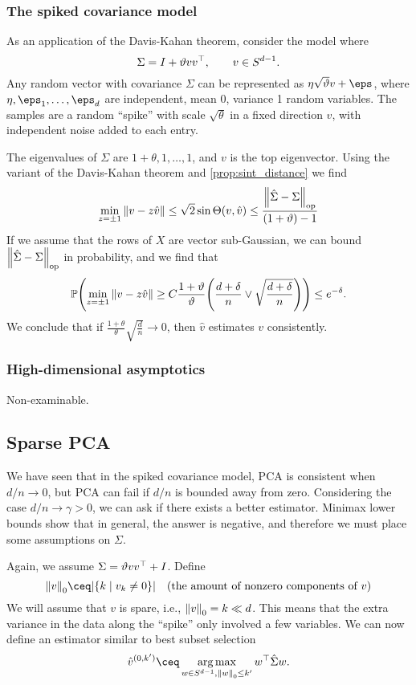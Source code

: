 \subsubsection{The spiked covariance model}
As an application of the Davis-Kahan theorem, consider the model where
\[
\Sigma = I + \vartheta v v^\top, \qquad  v\in S^{d-1}. 
\]
Any random vector with covariance $\Sigma$ can be represented as $\eta \sqrt\theta v + \eps$, where $\eta, \eps_1, \dotsc, \eps_d$ are independent, mean 0, variance 1 random variables. The samples are a random ``spike'' with scale $\sqrt\theta$ in a fixed direction $v$, with independent noise added to each entry. 

The eigenvalues of $\Sigma$ are $1+\theta, 1, \dotsc, 1$, and $v$ is the top eigenvector. Using the variant of the Davis-Kahan theorem and \cref{prop:sint_distance} we find 
\[
\min_{z = \pm 1} \norm{v - z\hat v} \leq \sqrt2 \sin\Theta(v, \hat v) \leq \frac{\norm{\hat \Sigma - \Sigma}_\mathrm{op}}{(1 + \vartheta) - 1}
\]
If we assume that the rows of $X$ are vector sub-Gaussian, we can bound $\norm{\hat\Sigma - \Sigma}_\mathrm{op}$ in probability, and we find that 
\[
\mathbb P\qty(\min_{z = \pm 1} \norm{v - z\hat v} \geq C \frac{1 + \vartheta}{\vartheta} \qty(\frac{d + \delta}{n} \lor \sqrt{\frac{d + \delta}{n}})) \leq e^{-\delta}. 
\]
We conclude that if $\frac{1+\theta}{\theta} \sqrt{\frac dn} \to 0$, then $\hat v$ estimates $v$ consistently. 

\subsubsection{High-dimensional asymptotics}
{\color{red} Non-examinable}. 

\subsection{Sparse PCA}
We have seen that in the spiked covariance model, PCA is consistent when $d/n \to 0$, but PCA can fail if $d/n$ is bounded away from zero. Considering the case $d/n \to \gamma > 0$, we can ask if there exists a better estimator. Minimax lower bounds show that in general, the answer is negative, and therefore we must place some assumptions on $\Sigma$.

Again, we assume $\Sigma = \vartheta vv^\top + I$. Define
\[
\norm{v}_0 \ceq \abs{\qty{k \mid v_k \neq 0}} \quad\text{(the amount of nonzero components of $v$)}
\]
We will assume that $v$ is spare, i.e., $\norm{v}_0 = k \ll d$. This means that the extra variance in the data along the ``spike'' only involved a few variables. 
We can now define an estimator similar to best subset selection
\[
\hat v^{(0, k')} \ceq \argmax_{w \in S^{d-1}, \norm{w}_0 \leq k'} w\T \hat\Sigma w. 
\]

